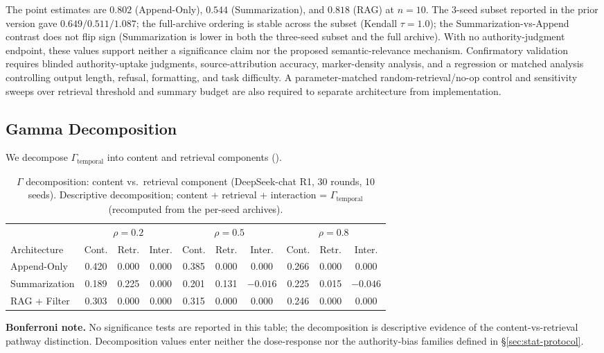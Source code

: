 \documentclass[11pt]{article}
\begin{document}
The point estimates are $0.802$ (Append-Only), $0.544$ (Summarization), and $0.818$ (RAG) at $n{=}10$. The $3$-seed subset reported in the prior version gave $0.649/0.511/1.087$; the full-archive ordering is stable across the subset (Kendall $\tau=1.0$); the Summarization-vs-Append contrast does not flip sign (Summarization is lower in both the three-seed subset and the full archive). With no authority-judgment endpoint, these values support neither a significance claim nor the proposed semantic-relevance mechanism. Confirmatory validation requires blinded authority-uptake judgments, source-attribution accuracy, marker-density analysis, and a regression or matched analysis controlling output length, refusal, formatting, and task difficulty. A parameter-matched random-retrieval/no-op control and sensitivity sweeps over retrieval threshold and summary budget are also required to separate architecture from implementation.



\subsection{Gamma Decomposition}

We decompose $\Gamma_{\text{temporal}}$ into content and retrieval components ().

\begin{table}[htbp]
\centering
\caption{$\Gamma$ decomposition: content vs.\ retrieval component (DeepSeek-chat R1, 30 rounds, 10 seeds). Descriptive decomposition; content + retrieval + interaction = $\Gamma_{\text{temporal}}$ (recomputed from the per-seed archives).}
\label{tab:decomposition}
\begin{tabular}{lccccccccc}
\toprule
 & \multicolumn{3}{c}{$\rho=0.2$} & \multicolumn{3}{c}{$\rho=0.5$} & \multicolumn{3}{c}{$\rho=0.8$} \\
\cmidrule(lr){2-4} \cmidrule(lr){5-7} \cmidrule(lr){8-10}
Architecture & Cont. & Retr. & Inter. & Cont. & Retr. & Inter. & Cont. & Retr. & Inter. \\
\midrule
Append-Only        & 0.420 & 0.000 & 0.000 & 0.385 & 0.000 & 0.000 & 0.266 & 0.000 & 0.000 \\
Summarization      & 0.189 & 0.225 & 0.000 & 0.201 & 0.131 & $-0.016$ & 0.225 & 0.015 & $-0.046$ \\
RAG + Filter       & 0.303 & 0.000 & 0.000 & 0.315 & 0.000 & 0.000 & 0.246 & 0.000 & 0.000 \\ \bottomrule
\end{tabular}
\par\smallskip
{\small\textbf{Bonferroni note.} No significance tests are reported in this table; the decomposition is descriptive evidence of the content-vs-retrieval pathway distinction. Decomposition values enter neither the dose-response nor the authority-bias families defined in \S\ref{sec:stat-protocol}.}
\end{table}
\end{document}
